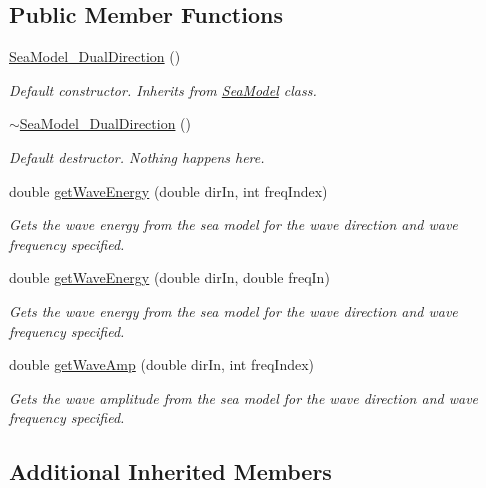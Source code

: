 \subsection*{Public Member Functions}
\begin{DoxyCompactItemize}
\item 
\hyperlink{classosea_1_1_sea_model___dual_direction_a2d2f262139193fb8997b6afdad062f83}{Sea\-Model\-\_\-\-Dual\-Direction} ()
\begin{DoxyCompactList}\small\item\em Default constructor. Inherits from \hyperlink{classosea_1_1_sea_model}{Sea\-Model} class. \end{DoxyCompactList}\item 
\hyperlink{classosea_1_1_sea_model___dual_direction_a4c4e6e445dee8a3f3c47b74544fdcc9e}{$\sim$\-Sea\-Model\-\_\-\-Dual\-Direction} ()
\begin{DoxyCompactList}\small\item\em Default destructor. Nothing happens here. \end{DoxyCompactList}\item 
double \hyperlink{classosea_1_1_sea_model___dual_direction_a3a922f077ff724845bd58f4f40a455d1}{get\-Wave\-Energy} (double dir\-In, int freq\-Index)
\begin{DoxyCompactList}\small\item\em Gets the wave energy from the sea model for the wave direction and wave frequency specified. \end{DoxyCompactList}\item 
double \hyperlink{classosea_1_1_sea_model___dual_direction_a3fdec50d9c1e58f35c3191b5b66f3845}{get\-Wave\-Energy} (double dir\-In, double freq\-In)
\begin{DoxyCompactList}\small\item\em Gets the wave energy from the sea model for the wave direction and wave frequency specified. \end{DoxyCompactList}\item 
double \hyperlink{classosea_1_1_sea_model___dual_direction_aaa1c940bc51196e440494ecf0ae051b2}{get\-Wave\-Amp} (double dir\-In, int freq\-Index)
\begin{DoxyCompactList}\small\item\em Gets the wave amplitude from the sea model for the wave direction and wave frequency specified. \end{DoxyCompactList}\end{DoxyCompactItemize}
\subsection*{Additional Inherited Members}


